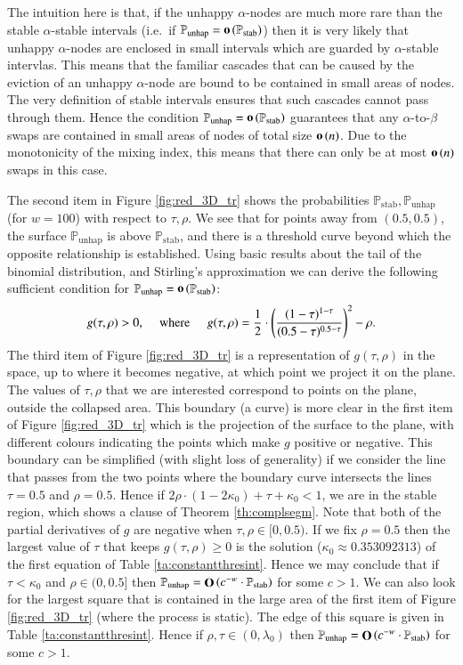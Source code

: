 \documentclass[11pt]{article}
\theoremstyle{plain}
\numberwithin{equation}{subsection}
\newcommand{\bigo}[1]{\mathop{\bf O}\/\left({#1}\right)}
\newcommand{\smo}[1]{\mathop{\bf o}\/\left({#1}\right)}
\newcommand{\Punhap}{\mathbb{P}_{\textrm{unhap}}}
\newcommand{\Pstab}{\mathbb{P}_{\textrm{stab}}}
\begin{document}
The intuition here is that, if the unhappy $\alpha$-nodes are much more rare than the
stable $\alpha$-stable intervals (i.e.\  if $\Punhap=\smo{\Pstab}$)  then it is very likely that unhappy
$\alpha$-nodes are enclosed in small intervals which are guarded by $\alpha$-stable intervlas. This means that
the familiar cascades that can be caused by the eviction of an unhappy $\alpha$-node are bound to be contained in small
areas of nodes. The very definition of stable intervals ensures that such cascades cannot pass through them. Hence the condition
 $\Punhap=\smo{\Pstab}$ guarantees that any $\alpha$-to-$\beta$ swaps are contained in small areas of nodes of total size $\smo{n}$.
 Due to the monotonicity of the mixing index, this means that there can only be at most 
 $\smo{n}$ swaps in this case.
 
The second item in Figure \ref{fig:red_3D_tr} shows the probabilities $\Pstab, \Punhap$ (for $w=100$)
with respect to $\tau,\rho$. We see that for points away from $(0.5, 0.5)$, the surface $\Punhap$ is above $\Pstab$, 
and there is a threshold curve beyond which the opposite relationship is established.
Using basic results about the tail of the binomial distribution, and Stirling's approximation
we can derive the following sufficient condition for $\Punhap =\smo{\Pstab}$:
\begin{equation}\label{eq:rhotaueqfostabgz}
\textrm{$g(\tau,\rho)>0$,\hspace{0.4cm} where \hspace{0.4cm}$g(\tau,\rho)=\frac{1}{2}\cdot 
\left(\frac{(1-\tau)^{1-\tau}}{(0.5-\tau)^{0.5-\tau}}
\right)^{2}-\rho.$}
\end{equation}
The third item of Figure \ref{fig:red_3D_tr}
is a representation of $g(\tau,\rho)$ in the space, up to where
it becomes negative, at which point we project it on the plane.
The values of $\tau,\rho$ that we are interested correspond to points
on the plane, outside the collapsed area.
This boundary (a curve) is more clear in the first 
item of Figure \ref{fig:red_3D_tr} which is the projection of the
surface to the plane, with different colours indicating the points
which make $g$ positive or negative.
This boundary can be simplified (with slight loss of generality) if we consider the line
that passes from the two points where the boundary curve intersects the lines $\tau=0.5$ and $\rho=0.5$.
Hence if $2\rho \cdot (1-2\kappa_0)+\tau +\kappa_0<1$, we are in the stable region, which shows a clause of Theorem \ref{th:complsegm}. 
Note that both of the partial derivatives of $g$ are negative 
when $\tau,\rho\in [0,0.5)$.
If we fix $\rho=0.5$ then the largest value of $\tau$ that keeps $g(\tau,\rho)\geq 0$
is the solution ($\kappa_0\approx 0.353092313$) of the first equation
of Table \ref{ta:constantthresint}. 
Hence we may conclude that
if  $\tau<\kappa_0$ 
and $\rho\in (0, 0.5]$ then 
$\Punhap =\bigo{c^{-w}\cdot\Pstab}$
for some $c>1$.
We can also look for the largest square that is contained 
in the large area of the first item of Figure \ref{fig:red_3D_tr} (where the process is static).
The edge of this square is given in Table \ref{ta:constantthresint}.
Hence if $\rho, \tau \in (0, \lambda_0)$ 
then $\Punhap =\bigo{c^{-w}\cdot\Pstab}$
for some $c>1$.
\end{document}
